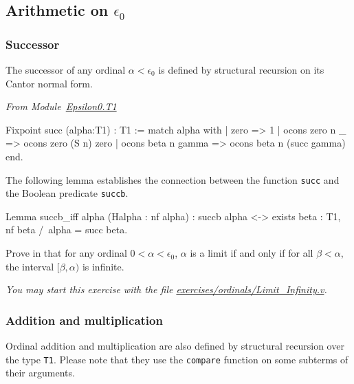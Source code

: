 \subsection{Arithmetic on \texorpdfstring{$\epsilon_0$}{epsilon0}}
\subsubsection{Successor}


The successor of any ordinal $\alpha< \epsilon_0$ is defined by structural 
recursion on its Cantor normal form.

\label{Functions:succ-T1}

\vspace{4pt}
\emph{From Module~\href{../theories/html/hydras.Epsilon0.T1.html\#succ}{Epsilon0.T1}}

\begin{Coqsrc}
Fixpoint succ (alpha:T1) : T1 :=
  match alpha with 
   | zero => 1
   | ocons zero n _ => ocons zero (S n) zero
   | ocons beta n gamma => ocons beta n (succ gamma)
 end.
\end{Coqsrc}


The following lemma establishes the connection between the  function
\texttt{succ} and the Boolean predicate \texttt{succb}.


\begin{Coqsrc}
 Lemma succb_iff alpha (Halpha : nf alpha) :
  succb alpha <-> exists beta : T1, nf beta /\ alpha = succ  beta.
\end{Coqsrc}

 \begin{exercise}
Prove in \coq{} that for any ordinal $0< \alpha<\epsilon_0$, $\alpha$ is a limit if 
and only if for all $\beta<\alpha$, the interval $[\beta,\alpha)$ is
infinite.

\emph{You may start this exercise with the file
     \href{https://github.com/coq-community/hydra-battles/tree/master/exercises/ordinals/Limit_Infinity.v}{exercises/ordinals/Limit\_Infinity.v}.}
 \end{exercise}


\subsubsection{Addition and multiplication}

Ordinal addition and multiplication are also defined by structural recursion over the type \texttt{T1}. Please note that they use the \texttt{compare} function on some subterms of their arguments.

